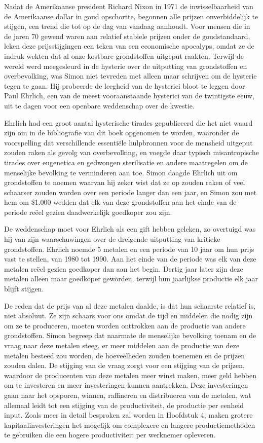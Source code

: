 Nadat de Amerikaanse president Richard Nixon in 1971 de inwisselbaarheid
van de Amerikaanse dollar in goud opschortte, begonnen alle prijzen
onverbiddelijk te stijgen, een trend die tot op de dag van vandaag
aanhoudt. Voor mensen die in de jaren 70 gewend waren aan relatief
stabiele prijzen onder de goudstandaard, leken deze prijsstijgingen een
teken van een economische apocalyps, omdat ze de indruk wekten dat al
onze kostbare grondstoffen uitgeput raakten. Terwijl de wereld werd
meegesleurd in de hysterie over de uitputting van grondstoffen en
overbevolking, was Simon niet tevreden met alleen maar schrijven om de
hysterie tegen te gaan. Hij probeerde de leegheid van de hysterici bloot
te leggen door Paul Ehrlich, een van de meest vooraanstaande hysterici
van de twintigste eeuw, uit te dagen voor een openbare weddenschap over
de kwestie.

Ehrlich had een groot aantal hysterische tirades gepubliceerd die het
niet waard zijn om in de bibliografie van dit boek opgenomen te worden,
waaronder de voorspelling dat verschillende essentiële hulpbronnen voor
de mensheid uitgeput zouden raken als gevolg van overbevolking, en
voegde daar typisch misantropische tirades over eugenetica en gedwongen
sterilisatie en andere maatregelen om de menselijke bevolking te
verminderen aan toe. Simon daagde Ehrlich uit om grondstoffen te noemen
waarvan hij zeker wist dat ze op zouden raken of veel schaarser zouden
worden over een periode langer dan een jaar, en Simon zou met hem om
\$1.000 wedden dat elk van deze grondstoffen aan het einde van de
periode reëel gezien daadwerkelijk goedkoper zou zijn.

De weddenschap moet voor Ehrlich als een gift hebben geleken, zo
overtuigd was hij van zijn waarschuwingen over de dreigende uitputting
van kritieke grondstoffen. Ehrlich noemde 5 metalen en een periode van
10 jaar om hun prijs vast te stellen, van 1980 tot 1990. Aan het einde
van de periode was elk van deze metalen reëel gezien goedkoper dan aan
het begin. Dertig jaar later zijn deze metalen alleen maar goedkoper
geworden, terwijl hun jaarlijkse productie elk jaar blijft stijgen.

De reden dat de prijs van al deze metalen daalde, is dat hun schaarste
relatief is, niet absoluut. Ze zijn schaars voor ons omdat de tijd en
middelen die nodig zijn om ze te produceren, moeten worden onttrokken
aan de productie van andere grondstoffen. Simon begreep dat naarmate de
menselijke bevolking toenam en de vraag naar deze metalen steeg, er meer
middelen aan de productie van deze metalen besteed zou worden, de
hoeveelheden zouden toenemen en de prijzen zouden dalen. De stijging van
de vraag zorgt voor een stijging van de prijzen, waardoor de producenten
van deze metalen meer winst maken, meer geld hebben om te investeren en
meer investeringen kunnen aantrekken. Deze investeringen gaan naar het
opsporen, winnen, raffineren en distribueren van de metalen, wat
allemaal leidt tot een stijging van de productiviteit, de productie per
eenheid input. Zoals meer in detail besproken zal worden in Hoofdstuk 4,
maken grotere kapitaalinvesteringen het mogelijk om complexere en
langere productiemethoden te gebruiken die een hogere productiviteit per
werknemer opleveren.


